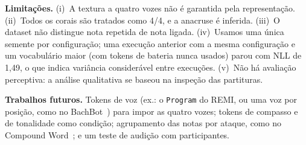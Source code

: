 \documentclass{article}
\begin{document}
\textbf{Limitações.} (i)~A textura a quatro vozes não é garantida pela representação. (ii)~Todos os corais são tratados como 4/4, e a anacruse é inferida. (iii)~O dataset não distingue nota repetida de nota ligada. (iv)~Usamos uma única semente por configuração; uma execução anterior com a mesma configuração e um vocabulário maior (com tokens de bateria nunca usados) parou com NLL de 1{,}49, o que indica variância considerável entre execuções. (v)~Não há avaliação perceptiva: a análise qualitativa se baseou na inspeção das partituras.

\textbf{Trabalhos futuros.} Tokens de voz (ex.: o \texttt{Program} do REMI, ou uma voz por posição, como no BachBot~\cite{liang2017bachbot}) para impor as quatro vozes; tokens de compasso e de tonalidade como condição; agrupamento das notas por ataque, como no Compound Word~\cite{hsiao2021cp}; e um teste de audição com participantes.


\end{document}
